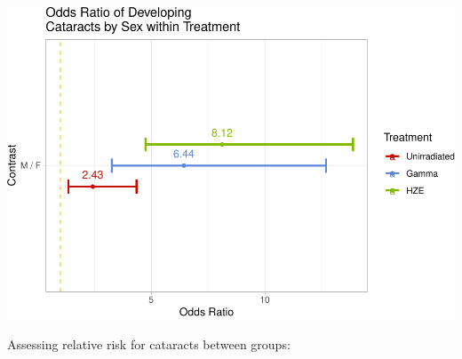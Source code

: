 \documentclass[
]{article}
\begin{document}
\includegraphics{final_report_files/figure-latex/oddsr2-1.pdf}

Assessing relative risk for cataracts between groups:
\end{document}
